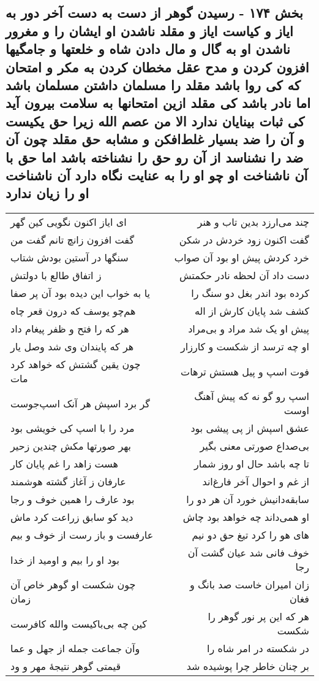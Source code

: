 \begin{center}
\section*{بخش ۱۷۴ - رسیدن گوهر از دست به دست آخر دور به ایاز و کیاست ایاز و مقلد ناشدن او ایشان را و مغرور ناشدن او به گال و مال دادن شاه و خلعتها و جامگیها افزون کردن و مدح عقل مخطان کردن به مکر و امتحان که کی روا باشد مقلد را مسلمان داشتن مسلمان باشد اما نادر باشد کی مقلد ازین امتحانها به سلامت بیرون آید کی ثبات بینایان ندارد الا من عصم الله زیرا حق یکیست و آن را ضد بسیار غلط‌افکن و مشابه حق مقلد چون آن ضد را نشناسد از آن رو حق را نشناخته باشد اما حق با آن ناشناخت او چو او را به عنایت نگاه دارد آن ناشناخت او را زیان ندارد}
\label{sec:sh174}
\begin{longtable}{l p{0.5cm} r}
ای ایاز اکنون نگویی کین گهر
&&
چند می‌ارزد بدین تاب و هنر
\\
گفت افزون زانچ تانم گفت من
&&
گفت اکنون زود خردش در شکن
\\
سنگها در آستین بودش شتاب
&&
خرد کردش پیش او بود آن صواب
\\
ز اتفاق طالع با دولتش
&&
دست داد آن لحظه نادر حکمتش
\\
یا به خواب این دیده بود آن پر صفا
&&
کرده بود اندر بغل دو سنگ را
\\
هم‌چو یوسف که درون قعر چاه
&&
کشف شد پایان کارش از اله
\\
هر که را فتح و ظفر پیغام داد
&&
پیش او یک شد مراد و بی‌مراد
\\
هر که پایندان وی شد وصل یار
&&
او چه ترسد از شکست و کارزار
\\
چون یقین گشتش که خواهد کرد مات
&&
فوت اسپ و پیل هستش ترهات
\\
گر برد اسپش هر آنک اسپ‌جوست
&&
اسپ رو گو نه که پیش آهنگ اوست
\\
مرد را با اسپ کی خویشی بود
&&
عشق اسپش از پی پیشی بود
\\
بهر صورتها مکش چندین زحیر
&&
بی‌صداع صورتی معنی بگیر
\\
هست زاهد را غم پایان کار
&&
تا چه باشد حال او روز شمار
\\
عارفان ز آغاز گشته هوشمند
&&
از غم و احوال آخر فارغ‌اند
\\
بود عارف را همین خوف و رجا
&&
سابقه‌دانیش خورد آن هر دو را
\\
دید کو سابق زراعت کرد ماش
&&
او همی‌داند چه خواهد بود چاش
\\
عارفست و باز رست از خوف و بیم
&&
های هو را کرد تیغ حق دو نیم
\\
بود او را بیم و اومید از خدا
&&
خوف فانی شد عیان گشت آن رجا
\\
چون شکست او گوهر خاص آن زمان
&&
زان امیران خاست صد بانگ و فغان
\\
کین چه بی‌باکیست والله کافرست
&&
هر که این پر نور گوهر را شکست
\\
وآن جماعت جمله از جهل و عما
&&
در شکسته در امر شاه را
\\
قیمتی گوهر نتیجهٔ مهر و ود
&&
بر چنان خاطر چرا پوشیده شد
\\
\end{longtable}
\end{center}
